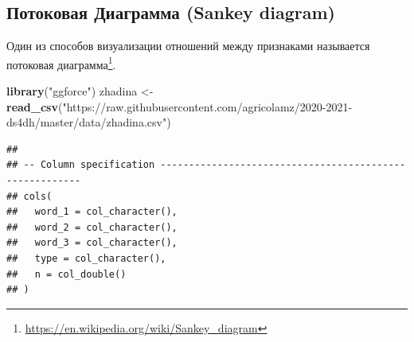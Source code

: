 \documentclass[
]{book}
\newenvironment{Shaded}{\begin{snugshade}}{\end{snugshade}}
\newcommand{\DataTypeTok}[1]{\textcolor[rgb]{0.13,0.29,0.53}{#1}}
\newcommand{\DecValTok}[1]{\textcolor[rgb]{0.00,0.00,0.81}{#1}}
\newcommand{\FloatTok}[1]{\textcolor[rgb]{0.00,0.00,0.81}{#1}}
\newcommand{\KeywordTok}[1]{\textcolor[rgb]{0.13,0.29,0.53}{\textbf{#1}}}
\newcommand{\NormalTok}[1]{#1}
\newcommand{\OperatorTok}[1]{\textcolor[rgb]{0.81,0.36,0.00}{\textbf{#1}}}
\newcommand{\StringTok}[1]{\textcolor[rgb]{0.31,0.60,0.02}{#1}}
\renewcommand{\href}[2]{#2\footnote{\url{#1}}}
\begin{document}
\hypertarget{ux43fux43eux442ux43eux43aux43eux432ux430ux44f-ux434ux438ux430ux433ux440ux430ux43cux43cux430-sankey-diagram}{%
\subsection{Потоковая Диаграмма (Sankey diagram)}\label{ux43fux43eux442ux43eux43aux43eux432ux430ux44f-ux434ux438ux430ux433ux440ux430ux43cux43cux430-sankey-diagram}}

Один из способов визуализации отношений между признаками называется \href{https://en.wikipedia.org/wiki/Sankey_diagram}{потоковая диаграмма}.

\begin{Shaded}
\begin{Highlighting}[]
\KeywordTok{library}\NormalTok{(}\StringTok{"ggforce"}\NormalTok{)}
\NormalTok{zhadina <-}\StringTok{ }\KeywordTok{read_csv}\NormalTok{(}\StringTok{"https://raw.githubusercontent.com/agricolamz/2020-2021-ds4dh/master/data/zhadina.csv"}\NormalTok{)}
\end{Highlighting}
\end{Shaded}

\begin{verbatim}
## 
## -- Column specification --------------------------------------------------------
## cols(
##   word_1 = col_character(),
##   word_2 = col_character(),
##   word_3 = col_character(),
##   type = col_character(),
##   n = col_double()
## )
\end{verbatim}

\begin{Shaded}
\end{Shaded}
\end{document}
